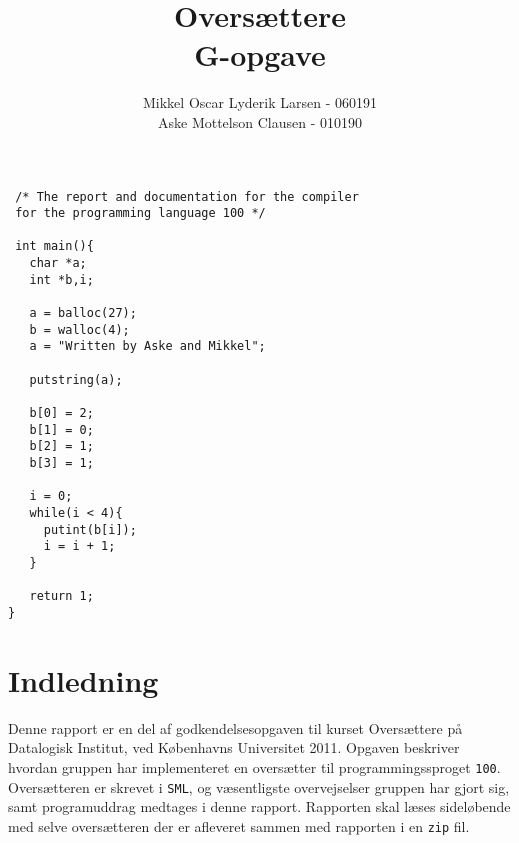 \documentclass[12pt]{article}
\begin{document}
\author{Mikkel Oscar Lyderik Larsen - 060191 \\ Aske Mottelson Clausen - 010190}
\title{Oversættere \\ G-opgave}
\maketitle

\begin{verbatim}
 /* The report and documentation for the compiler
 for the programming language 100 */

 int main(){
   char *a;
   int *b,i;

   a = balloc(27);
   b = walloc(4);
   a = "Written by Aske and Mikkel";
 
   putstring(a);
 
   b[0] = 2;
   b[1] = 0;
   b[2] = 1;
   b[3] = 1;

   i = 0;
   while(i < 4){
     putint(b[i]);
     i = i + 1;
   }
 
   return 1;
}
\end{verbatim}



\newpage




\tableofcontents

\newpage 

\section*{Indledning}
Denne rapport er en del af godkendelsesopgaven til kurset Oversættere på Datalogisk Institut, ved Københavns Universitet 2011. Opgaven beskriver hvordan gruppen har implementeret en oversætter til programmingssproget \texttt{100}. Oversætteren er skrevet i \texttt{SML}, og væsentligste overvejselser gruppen har gjort sig, samt programuddrag medtages i denne rapport. Rapporten skal læses sideløbende med selve oversætteren der er afleveret sammen med rapporten i en \texttt{zip} fil.
\end{document}
